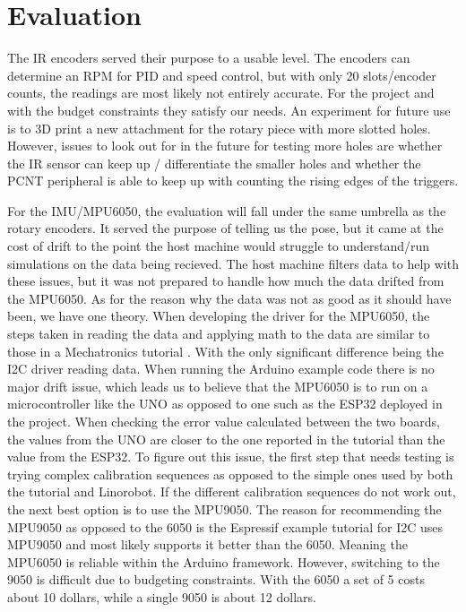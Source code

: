 \documentclass[conference]{IEEEtran}
\begin{document}
\section{Evaluation}
The IR encoders served their purpose to a usable level. The encoders can determine an RPM for PID and speed control, but with only 20 slots/encoder counts, the readings are most likely not entirely accurate. For the project and with the budget constraints they satisfy our needs. An experiment for future use is to 3D print a new attachment for the rotary piece with more slotted holes. However, issues to look out for in the future for testing more holes are whether the IR sensor can keep up / differentiate the smaller holes and whether the PCNT peripheral is able to keep up with counting the rising edges of the triggers.

For the IMU/MPU6050, the evaluation will fall under the same umbrella as the rotary encoders. It served the purpose of telling us the pose, but it came at the cost of drift to the point the host machine would struggle to understand/run simulations on the data being recieved. The host machine filters data to help with these issues, but it was not prepared to handle how much the data drifted from the MPU6050. As for the reason why the data was not as good as it should have been, we have one theory. When developing the driver for the MPU6050, the steps taken in reading the data and applying math to the data are similar to those in a Mechatronics tutorial \cite{RN106}. With the only significant difference being the I2C driver reading data. When running the Arduino example code there is no major drift issue, which leads us to believe that the MPU6050 is to run on a microcontroller like the UNO as opposed to one such as the ESP32 deployed in the project. When checking the error value calculated between the two boards, the values from the UNO are closer to the one reported in the tutorial than the value from the ESP32. To figure out this issue, the first step that needs testing is trying complex calibration sequences as opposed to the simple ones used by both the tutorial and Linorobot. If the different calibration sequences do not work out, the next best option is to use the MPU9050. The reason for recommending the MPU9050 as opposed to the 6050 is the Espressif example tutorial for I2C uses MPU9050 and most likely supports it better than the 6050. Meaning the MPU6050 is reliable within the Arduino framework. However, switching to the 9050 is difficult due to budgeting constraints. With the 6050 a set of 5 costs about 10 dollars, while a single 9050 is about 12 dollars.
\end{document}
